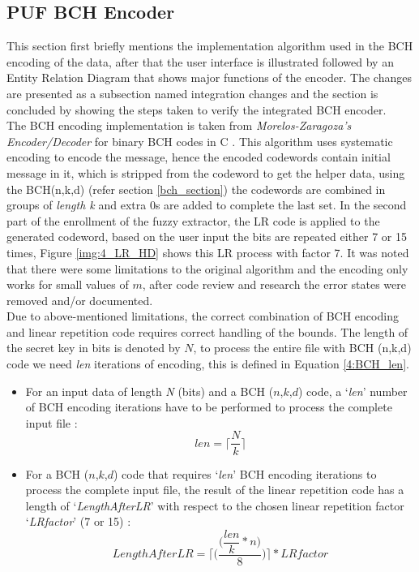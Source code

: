 \subsection{PUF BCH Encoder}
This section first briefly mentions the implementation algorithm used in the BCH encoding of the data, after that the user interface is illustrated followed by an Entity Relation Diagram that shows major functions of the encoder. The changes are presented as a subsection named integration changes and the section is concluded by showing the steps taken to verify the integrated BCH encoder.\\

The BCH encoding implementation is taken from \emph{Morelos-Zaragoza's Encoder/Decoder} for binary BCH codes in C \cite{69}. This algorithm uses systematic encoding to encode the message, hence the encoded codewords contain initial message in it, which is stripped from the codeword to get the helper data, using the BCH(n,k,d) (refer section \ref{bch_section}) the codewords are combined in groups of \emph{length k} and extra 0s are added to complete the last set. In the
second part of the enrollment of the fuzzy extractor, the LR code is applied to the generated codeword, based on the user input the bits are repeated either 7 or 15 times, Figure \ref{img:4_LR_HD} shows this LR process with factor 7. It was noted that there were some limitations to the original algorithm and the encoding only works for small values of $m$, after code review and research the error states were removed and/or documented.\\

	Due to above-mentioned limitations, the correct combination of BCH encoding and linear repetition code requires correct handling of the bounds. The length of the secret key in bits is denoted by $N$, to process the entire file with BCH (n,k,d) code we need \emph{len} iterations of encoding, this is defined in Equation \ref{4:BCH_len}.

	\begin{itemize}
		\item For an input data of length \emph{N} (bits) and a BCH ($n$,$k$,$d$) code, a ‘\emph{len}’ number of BCH encoding iterations have to be performed to process the complete input file \cite{71}:
	\begin{equation}
		len =\Bigg\lceil\dfrac{N}{k}\Bigg\rceil
		\label{4:BCH_len}
	\end{equation}

	\item For a BCH ($n$,$k$,$d$) code that requires ‘\emph{len}’ BCH encoding iterations to process the complete input file, the result of the linear repetition code has a length of ‘\emph{LengthAfterLR}’ with respect to the chosen linear repetition factor ‘\emph{LRfactor}’ (7 or 15) \cite{71}:
	\begin{equation}
		LengthAfterLR = \Bigg\lceil\Bigg(\dfrac{\Bigg(\dfrac{len}{k} * n\Bigg)}{8}\Bigg)\Bigg\rceil * LRfactor
	\label{4:BCH_LR_len}
	\end{equation}
	\end{itemize}

